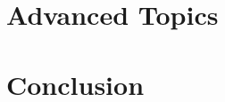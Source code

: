 \documentclass{book}
\theoremstyle{definition}
\begin{document}
\part{Advanced Topics}







\part{Conclusion}







%
%
%
\end{document}
